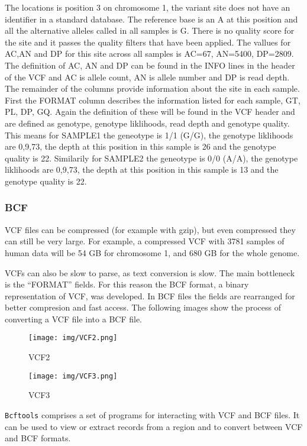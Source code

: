 \documentclass[11pt]{article}
\begin{document}
    The locations is position 3 on chromosome 1, the variant site does not
have an identifier in a standard database. The reference base is an A at
this position and all the alternative alleles called in all samples is
G. There is no quality score for the site and it passes the quality
filters that have been applied. The vallues for AC,AN and DP for this
site across all samples is AC=67, AN=5400, DP=2809. The definition of
AC, AN and DP can be found in the INFO lines in the header of the VCF
and AC is allele count, AN is allele number and DP is read depth. The
remainder of the columns provide information about the site in each
sample. First the FORMAT column describes the information listed for
each sample, GT, PL, DP, GQ. Again the definition of these will be found
in the VCF header and are defined as genotype, genotype liklihoods, read
depth and genotype quality. This means for SAMPLE1 the geneotype is 1/1
(G/G), the genotype liklihoods are 0,9,73, the depth at this position in
this sample is 26 and the genotype quality is 22. Similarily for SAMPLE2
the geneotype is 0/0 (A/A), the genotype liklihoods are 0,9,73, the
depth at this position in this sample is 13 and the genotype quality is
22.

    \hypertarget{bcf}{%
\subsubsection{BCF}\label{bcf}}

VCF files can be compressed (for example with gzip), but even compressed
they can still be very large. For example, a compressed VCF with 3781
samples of human data will be 54 GB for chromosome 1, and 680 GB for the
whole genome.

VCFs can also be slow to parse, as text conversion is slow. The main
bottleneck is the ``FORMAT'' fields. For this reason the BCF format, a
binary representation of VCF, was developed. In BCF files the fields are
rearranged for better compresion and fast access. The following images
show the process of converting a VCF file into a BCF file.

    \begin{figure}
\centering
\texttt{[image: img/VCF2.png]}
\caption{VCF2}
\end{figure}

    \begin{figure}
\centering
\texttt{[image: img/VCF3.png]}
\caption{VCF3}
\end{figure}

    \texttt{Bcftools} comprises a set of programs for interacting with VCF
and BCF files. It can be used to view or extract records from a region
and to convert between VCF and BCF formats.
\end{document}
